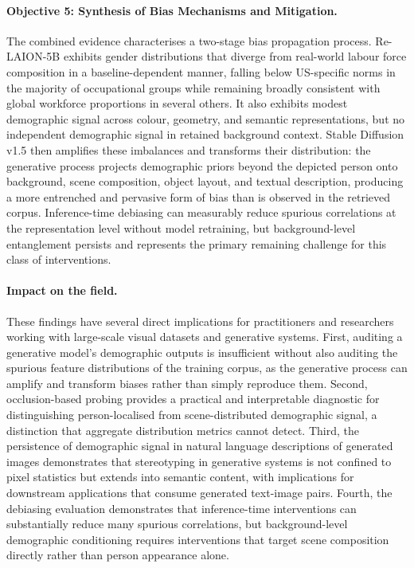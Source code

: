 \paragraph{Objective 5: Synthesis of Bias Mechanisms and Mitigation.}
The combined evidence characterises a two-stage bias propagation process. Re-LAION-5B
exhibits gender distributions that diverge from real-world labour force composition in a
baseline-dependent manner, falling below US-specific norms in the majority of occupational
groups while remaining broadly consistent with global workforce proportions in several
others. It also exhibits modest demographic signal across colour, geometry, and semantic
representations, but no independent demographic signal in retained background context.
Stable Diffusion v1.5 then amplifies these imbalances and transforms their distribution:
the generative process projects demographic priors beyond the depicted person onto
background, scene composition, object layout, and textual description, producing a more
entrenched and pervasive form of bias than is observed in the retrieved corpus.
Inference-time debiasing can measurably reduce spurious correlations at the representation
level without model retraining, but background-level entanglement persists and represents
the primary remaining challenge for this class of interventions.

\paragraph{Impact on the field.}
These findings have several direct implications for practitioners and researchers working
with large-scale visual datasets and generative systems. First, auditing a generative
model's demographic outputs is insufficient without also auditing the spurious feature
distributions of the training corpus, as the generative process can amplify and transform
biases rather than simply reproduce them. Second, occlusion-based probing provides a
practical and interpretable diagnostic for distinguishing person-localised from
scene-distributed demographic signal, a distinction that aggregate distribution metrics
cannot detect. Third, the persistence of demographic signal in natural language
descriptions of generated images demonstrates that stereotyping in generative systems is
not confined to pixel statistics but extends into semantic content, with implications for
downstream applications that consume generated text-image pairs. Fourth, the debiasing
evaluation demonstrates that inference-time interventions can substantially reduce many
spurious correlations, but background-level demographic conditioning requires
interventions that target scene composition directly rather than person appearance alone.

